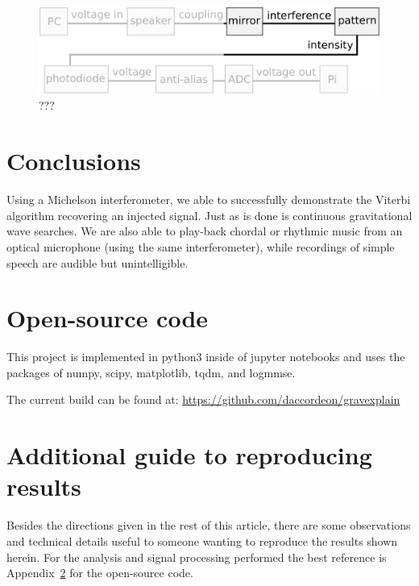 \documentclass[prb,preprint]{revtex4-1}
\begin{document}
\begin{figure}%
	\includegraphics[width=\textwidth]{figures/pipeline_highlighted.pdf}
	\caption{???}
	\label{fig:pipeline_highlighted}
\end{figure}


\section{Conclusions}
\label{sec:conclusions}

Using a Michelson interferometer, we able to successfully demonstrate the Viterbi algorithm recovering an injected signal. Just as is done is continuous gravitational wave searches. We are also able to play-back chordal or rhythmic music from an optical microphone (using the same interferometer), while recordings of simple speech are audible but unintelligible.

\newpage
\appendix

\section{Open-source code}
\label{app:code}
This project is implemented in python3\cite{python} inside of jupyter notebooks\cite{jupyter}\cite{ipython} and uses the packages of numpy\cite{numpy}, scipy\cite{scipy}, matplotlib\cite{matplotlib}, tqdm\cite{tqdm}, and logmmse\cite{logmmse}.

The current build can be found at:
\url{https://github.com/daccordeon/gravexplain}

\section{Additional guide to reproducing results}
\label{app:reproducing_results}

Besides the directions given in the rest of this article, there are some observations and technical details useful to someone wanting to reproduce the results shown herein. For the analysis and signal processing performed the best reference is Appendix~\ref{app:code} for the open-source code.
\end{document}
